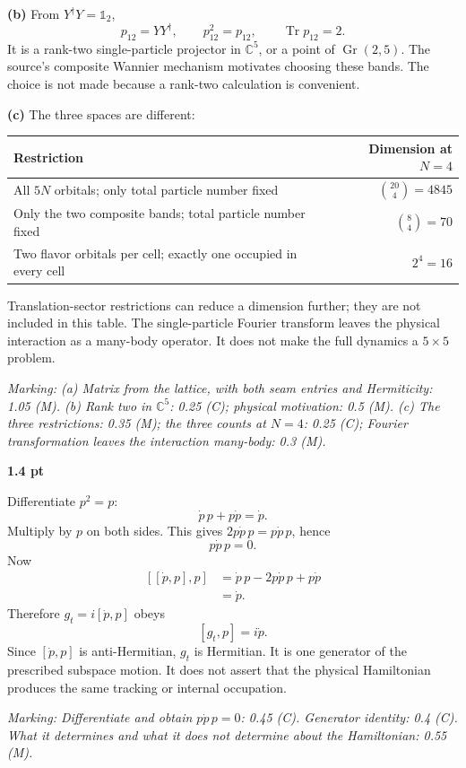\documentclass[11pt,a4paper]{article}
\newcommand{\Tr}{\operatorname{Tr}}
\newcommand{\soltitle}[3]{\par\Needspace{4\baselineskip}{\bfseries\color{ink}#1\quad #3}\hfill{\small\bfseries #2 pt}\par}
\newcommand{\marking}[1]{\par{\footnotesize\textit{Marking: #1}}\par}
\newcommand{\id}{\mathds 1}
\begin{document}
\textbf{(b)} From $Y^\dagger Y=\id_2$,
\[
p_{12}=YY^\dagger,\qquad p_{12}^2=p_{12},\qquad\Tr p_{12}=2.
\]
It is a rank-two single-particle projector in $\mathbb C^5$, or a point of $\operatorname{Gr}(2,5)$. The source's composite Wannier mechanism motivates choosing these bands. The choice is not made because a rank-two calculation is convenient.

\textbf{(c)} The three spaces are different:
\begin{center}\small
\begin{tabularx}{\textwidth}{@{}Y r@{}}\toprule
Restriction&Dimension at $N=4$\\\midrule
All $5N$ orbitals; only total particle number fixed&$\binom{20}{4}=4845$\\
Only the two composite bands; total particle number fixed&$\binom{8}{4}=70$\\
Two flavor orbitals per cell; exactly one occupied in every cell&$2^4=16$\\\bottomrule
\end{tabularx}
\end{center}
Translation-sector restrictions can reduce a dimension further; they are not included in this table. The single-particle Fourier transform leaves the physical interaction as a many-body operator. It does not make the full dynamics a $5\times5$ problem.

\marking{(a) Matrix from the lattice, with both seam entries and Hermiticity: 1.05 (M). (b) Rank two in $\mathbb C^5$: 0.25 (C); physical motivation: 0.5 (M). (c) The three restrictions: 0.35 (M); the three counts at $N=4$: 0.25 (C); Fourier transformation leaves the interaction many-body: 0.3 (M).}


\soltitle{B.2}{1.4}{The projector generator}
Differentiate $p^2=p$:
\[
\dot p\,p+p\dot p=\dot p.
\]
Multiply by $p$ on both sides. This gives $2p\dot p\,p=p\dot p\,p$, hence
\[
p\dot p\,p=0.
\]
Now
\[
\begin{split}
[[\dot p,p],p]
&=\dot p\,p-2p\dot p\,p+p\dot p\\
&=\dot p.
\end{split}
\]
Therefore $g_t=i[\dot p,p]$ obeys
\[
\boxed{[g_t,p]=i\dot p.}
\]
Since $[\dot p,p]$ is anti-Hermitian, $g_t$ is Hermitian. It is one generator of the prescribed subspace motion. It does not assert that the physical Hamiltonian produces the same tracking or internal occupation.
\marking{Differentiate and obtain $p\dot p\,p=0$: 0.45 (C). Generator identity: 0.4 (C). What it determines and what it does not determine about the Hamiltonian: 0.55 (M).}
\end{document}
